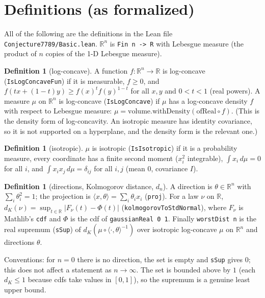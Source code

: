 \documentclass[11pt]{article}
\theoremstyle{definition}
\newtheorem{definition}[theorem]{Definition}
\newcommand{\R}{\mathbb{R}}
\begin{document}
\section{Definitions (as formalized)}

All of the following are the definitions in the Lean file \texttt{Conjecture7789/Basic.lean}.
$\R^n$ is \texttt{Fin n -> R} with Lebesgue measure (the product of $n$ copies of the 1-D
Lebesgue measure).

\begin{definition}[log-concave]
A function $f:\R^n\to\R$ is log-concave (\texttt{IsLogConcaveFun}) if it is measurable,
$f\ge 0$, and $f(tx+(1-t)y)\ge f(x)^t f(y)^{1-t}$ for all $x,y$ and $0<t<1$ (real powers). A
measure $\mu$ on $\R^n$ is log-concave (\texttt{IsLogConcave}) if $\mu$ has a log-concave density
$f$ with respect to Lebesgue measure: $\mu = \mathrm{volume.withDensity}(\mathrm{ofReal}\circ f)$.
(This is the density form of log-concavity. An isotropic measure has identity covariance, so it
is not supported on a hyperplane, and the density form is the relevant one.)
\end{definition}

\begin{definition}[isotropic]
$\mu$ is isotropic (\texttt{IsIsotropic}) if it is a probability measure, every coordinate has a
finite second moment ($x_i^2$ integrable), $\int x_i\,d\mu = 0$ for all $i$, and
$\int x_i x_j\,d\mu = \delta_{ij}$ for all $i,j$ (mean $0$, covariance $I$).
\end{definition}

\begin{definition}[directions, Kolmogorov distance, $d_n$]
A direction is $\theta\in\R^n$ with $\sum_i\theta_i^2=1$; the projection is
$\langle x,\theta\rangle=\sum_i \theta_i x_i$ (\texttt{proj}). For a law $\nu$ on $\R$,
$d_K(\nu)=\sup_{t\in\R}|F_\nu(t)-\Phi(t)|$ (\texttt{kolmogorovToStdNormal}), where $F_\nu$ is
Mathlib's \texttt{cdf} and $\Phi$ is the cdf of \texttt{gaussianReal 0 1}. Finally
\texttt{worstDist n} is the real supremum (\texttt{sSup}) of $d_K(\mu\circ\langle\cdot,\theta\rangle^{-1})$
over isotropic log-concave $\mu$ on $\R^n$ and directions $\theta$.
\end{definition}

Conventions: for $n=0$ there is no direction, the set is empty and \texttt{sSup} gives $0$;
this does not affect a statement as $n\to\infty$. The set is bounded above by $1$ (each $d_K\le 1$
because cdfs take values in $[0,1]$), so the supremum is a genuine least upper bound.
\end{document}
